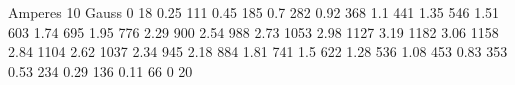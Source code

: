 Amperes	10 Gauss
0	18
0.25	111
0.45	185
0.7	282
0.92	368
1.1	441
1.35	546
1.51	603
1.74	695
1.95	776
2.29	900
2.54	988
2.73	1053
2.98	1127
3.19	1182
3.06	1158
2.84	1104
2.62	1037
2.34	945
2.18	884
1.81	741
1.5	622
1.28	536
1.08	453
0.83	353
0.53	234
0.29	136
0.11	66
0	20
